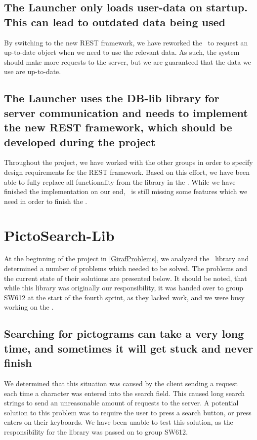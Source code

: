 \subsection*{The Launcher only loads user-data on startup. This can lead to
outdated data being used} By switching to the new REST framework, we have
reworked the \lapp\ to request an up-to-date  object when we need to
use the relevant data. As such, the system should make more requests to the server,
but we are guaranteed that the data we use are up-to-date.

\subsection*{The Launcher uses the DB-lib library for server communication and
needs to implement the new REST framework, which should be developed during the
project} Throughout the project, we have worked with the other groups in order
to specify design requirements for the REST framework. Based on this effort, we
have been able to fully replace all functionality from the  library
in the \lapp. While we have finished the implementation on our end, \rlib\
is still missing some features which we need in order to finish the \lapp.

\section{PictoSearch-Lib}
At the beginning of the project in \autoref{GirafProblems}, we analyzed the
\plib\ library and determined a number of problems which needed to be solved.
The problems and the current state of their solutions are presented below. It
should be noted, that while this library was originally our responsibility, it
was handed over to group SW612 at the start of the fourth sprint, as they lacked
work, and we were busy working on the \lapp.

\subsection*{Searching for pictograms can take a very long time, and sometimes
it will get stuck and never finish} We determined that this situation was caused
by the client sending a request each time a character was entered into the
search field. This caused long search strings to send an unreasonable amount of
requests to the server. A potential solution to this problem was to require the
user to press a search button, or press enters on their keyboards. We have been
unable to test this solution, as the responsibility for the library was passed
on to group SW612.
  
